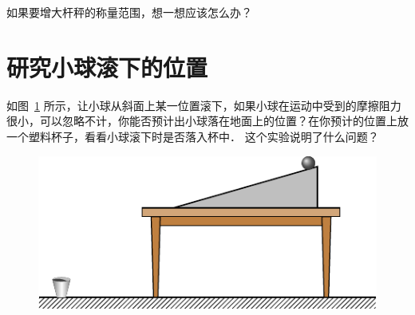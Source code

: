 如果要增大杆秤的称量范围，想一想应该怎么办？

\section{研究小球滚下的位置}
如图~\ref{fig_A_10-24} 所示，让小球从斜面上某一位置滚下，如果小球在运动中受到的摩擦阻力很小，可以忽略不计，你能否预计出小球落在地面上的位置？在你预计的位置上放一个塑料杯子，看看小球滚下时是否落入杯中．
这个实验说明了什么问题？
\begin{figure}[htbp]
    \centering
    \includegraphics{fig/A/10-24.pdf}
    \caption{}\label{fig_A_10-24}
\end{figure}





